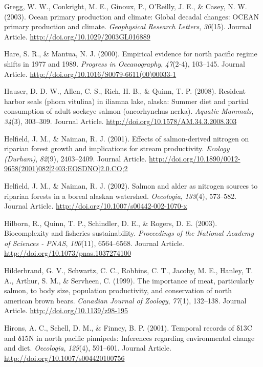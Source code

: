 \documentclass [11pt, proquest] {uwthesis}[2015/03/03]
\begin{document}
\hypertarget{ref-Gregg2003}{}
Gregg, W. W., Conkright, M. E., Ginoux, P., O'Reilly, J. E., \& Casey,
N. W. (2003). Ocean primary production and climate: Global decadal
changes: OCEAN primary production and climate. \emph{Geophysical
Research Letters}, \emph{30}(15). Journal Article.
\url{http://doi.org/10.1029/2003GL016889}

\hypertarget{ref-Hare2000}{}
Hare, S. R., \& Mantua, N. J. (2000). Empirical evidence for north
pacific regime shifts in 1977 and 1989. \emph{Progress in Oceanography},
\emph{47}(2-4), 103--145. Journal Article.
\url{http://doi.org/10.1016/S0079-6611(00)00033-1}

\hypertarget{ref-Hauser2008}{}
Hauser, D. D. W., Allen, C. S., Rich, H. B., \& Quinn, T. P. (2008).
Resident harbor seals (phoca vitulina) in iliamna lake, alaska: Summer
diet and partial consumption of adult sockeye salmon (oncorhynchus
nerka). \emph{Aquatic Mammals}, \emph{34}(3), 303--309. Journal Article.
\url{http://doi.org/10.1578/AM.34.3.2008.303}

\hypertarget{ref-Helfield2001}{}
Helfield, J. M., \& Naiman, R. J. (2001). Effects of salmon-derived
nitrogen on riparian forest growth and implications for stream
productivity. \emph{Ecology (Durham)}, \emph{82}(9), 2403--2409. Journal
Article.
\href{http://doi.org/10.1890/0012-9658(2001)082\%5B2403:EOSDNO\%5D2.0.CO;2}{http://doi.org/10.1890/0012-9658(2001)082{[}2403:EOSDNO{]}2.0.CO;2}

\hypertarget{ref-Helfield2002}{}
Helfield, J. M., \& Naiman, R. J. (2002). Salmon and alder as nitrogen
sources to riparian forests in a boreal alaskan watershed.
\emph{Oecologia}, \emph{133}(4), 573--582. Journal Article.
\url{http://doi.org/10.1007/s00442-002-1070-x}

\hypertarget{ref-Hilborn2003}{}
Hilborn, R., Quinn, T. P., Schindler, D. E., \& Rogers, D. E. (2003).
Biocomplexity and fisheries sustainability. \emph{Proceedings of the
National Academy of Sciences - PNAS}, \emph{100}(11), 6564--6568.
Journal Article. \url{http://doi.org/10.1073/pnas.1037274100}

\hypertarget{ref-Hilderbrand1999}{}
Hilderbrand, G. V., Schwartz, C. C., Robbins, C. T., Jacoby, M. E.,
Hanley, T. A., Arthur, S. M., \& Servheen, C. (1999). The importance of
meat, particularly salmon, to body size, population productivity, and
conservation of north american brown bears. \emph{Canadian Journal of
Zoology}, \emph{77}(1), 132--138. Journal Article.
\url{http://doi.org/10.1139/z98-195}

\hypertarget{ref-Hirons2001}{}
Hirons, A. C., Schell, D. M., \& Finney, B. P. (2001). Temporal records
of δ13C and δ15N in north pacific pinnipeds: Inferences regarding
environmental change and diet. \emph{Oecologia}, \emph{129}(4),
591--601. Journal Article. \url{http://doi.org/10.1007/s004420100756}
\end{document}
